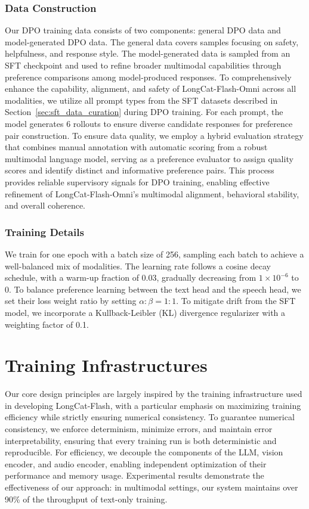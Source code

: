 \documentclass{article}
\newcommand{\longcat}{LongCat-Flash-Omni\xspace}
\begin{document}
\subsubsection{Data Construction} %
Our DPO training data consists of two components: general DPO data and model-generated DPO data. The general data covers samples focusing on safety, helpfulness, and response style. The model-generated data is sampled from an SFT checkpoint and used to refine broader multimodal capabilities through preference comparisons among model-produced responses. 
To comprehensively enhance the capability, alignment, and safety of \longcat across all modalities, we utilize all prompt types from the SFT datasets described in Section~\ref{sec:sft_data_curation} during DPO training. 
For each prompt, the model generates 6 rollouts to ensure diverse candidate responses for preference pair construction. 
To ensure data quality, we employ a hybrid evaluation strategy that combines manual annotation with automatic scoring from a robust multimodal language model, serving as a preference evaluator to assign quality scores and identify distinct and informative preference pairs. This process provides reliable supervisory signals for DPO training, enabling effective refinement of \longcat’s multimodal alignment, behavioral stability, and overall coherence.

\subsubsection{Training Details}
We train for one epoch with a batch size of 256, sampling each batch to achieve a well-balanced mix of modalities. The learning rate follows a cosine decay schedule, with a warm-up fraction of 0.03, gradually decreasing from $1\times10^{-6}$ to 0. To balance preference learning between the text head and the speech head, we set their loss weight ratio by setting $\alpha : \beta = 1 : 1$. To mitigate drift from the SFT model, we incorporate a Kullback-Leibler (KL) divergence regularizer with a weighting factor of 0.1.

\section{Training Infrastructures} %
\label{sec6:infra}
Our core design principles are largely inspired by the training infrastructure used in developing LongCat-Flash, with a particular emphasis on maximizing training efficiency while strictly ensuring numerical consistency. To guarantee numerical consistency, we enforce determinism, minimize errors, and maintain error interpretability, ensuring that every training run is both deterministic and reproducible. For efficiency, we decouple the components of the LLM, vision encoder, and audio encoder, enabling independent optimization of their performance and memory usage. Experimental results demonstrate the effectiveness of our approach: in multimodal settings, our system maintains over 90\% of the throughput of text-only training.
\end{document}
